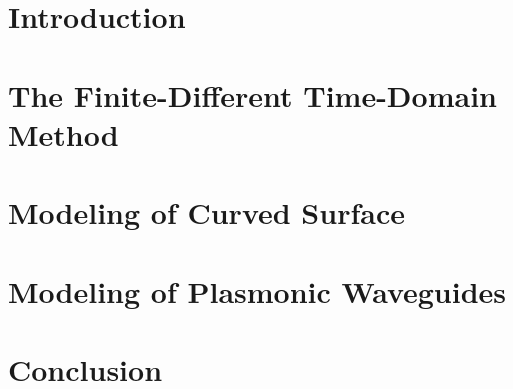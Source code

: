 \documentclass{book}
\begin{document}
\fontsize{12}{2em}\selectfont





\tableofcontents



\chapter{Introduction}







\chapter{The Finite-Different Time-Domain Method}










\chapter{Modeling of Curved Surface}



\chapter{Modeling of Plasmonic Waveguides}



\chapter{Conclusion}
\end{document}

